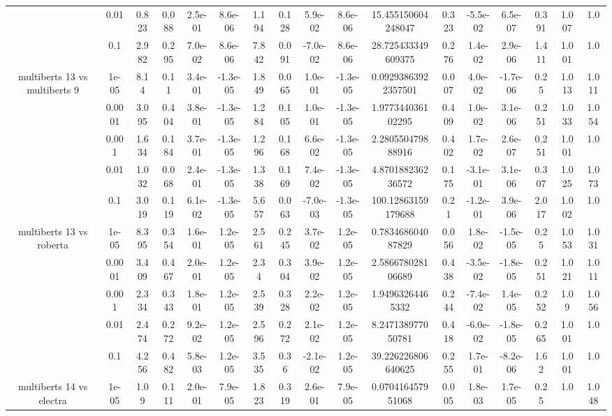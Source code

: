 \begin{tabular}{|c|c|c|c|c|c|c|c|c|c|c|c|c|c|c|c|c|}
 & 0.01 & 0.823 & 0.088 & 2.5e-01 & 8.6e-06 & 1.194 & 0.128 & 5.9e-02 & 8.6e-06 & 15.455150604248047 & 0.323 & -5.5e-02 & 6.5e-07 & 0.391 & 1.007 & 1.0 \\
 & 0.1 & 2.982 & 0.295 & 7.0e-02 & 8.6e-06 & 7.842 & 0.091 & -7.0e-02 & 8.6e-06 & 28.725433349609375 & 0.276 & 1.4e-02 & 2.9e-06 & 1.411 & 1.001 & 1.0 \\
\hline
\multirow{5}{*}{multiberts 13 vs multiberts 9} & 1e-05 & 8.14 & 0.11 & 3.4e-01 & -1.3e-05 & 1.849 & 0.065 & 1.0e-01 & -1.3e-05 & 0.09293863922357501 & 0.007 & 4.0e-02 & -1.7e-06 & 0.25 & 1.013 & 1.011 \\
 & 0.0001 & 3.095 & 0.404 & 3.8e-01 & -1.3e-05 & 1.284 & 0.105 & 1.0e-01 & -1.3e-05 & 1.977344036102295 & 0.409 & 1.0e-02 & 3.1e-06 & 0.251 & 1.033 & 1.054 \\
 & 0.001 & 1.634 & 0.184 & 3.7e-01 & -1.3e-05 & 1.296 & 0.168 & 6.6e-02 & -1.3e-05 & 2.280550479888916 & 0.402 & 1.7e-02 & 2.6e-07 & 0.251 & 1.001 & 1.0 \\
 & 0.01 & 1.032 & 0.068 & 2.4e-01 & -1.3e-05 & 1.338 & 0.169 & 7.4e-02 & -1.3e-05 & 4.870188236236572 & 0.175 & -3.1e-01 & 3.1e-06 & 0.307 & 1.025 & 1.073 \\
 & 0.1 & 3.019 & 0.119 & 6.1e-02 & -1.3e-05 & 5.657 & 0.063 & -7.0e-03 & -1.3e-05 & 100.12863159179688 & 0.21 & -1.2e-01 & 3.9e-06 & 2.017 & 1.002 & 1.0 \\
\hline
\multirow{5}{*}{multiberts 13 vs roberta } & 1e-05 & 8.395 & 0.354 & 1.6e-01 & 1.2e-05 & 2.561 & 0.245 & 3.7e-02 & 1.2e-05 & 0.783468604087829 & 0.056 & 1.8e-02 & -1.5e-05 & 0.25 & 1.053 & 1.031 \\
 & 0.0001 & 3.409 & 0.467 & 2.0e-01 & 1.2e-05 & 2.34 & 0.304 & 3.9e-02 & 1.2e-05 & 2.586678028106689 & 0.438 & -3.5e-02 & -1.8e-05 & 0.251 & 1.021 & 1.011 \\
 & 0.001 & 2.334 & 0.343 & 1.8e-01 & 1.2e-05 & 2.539 & 0.328 & 2.2e-02 & 1.2e-05 & 1.94963264465332 & 0.244 & -7.4e-02 & 1.4e-05 & 0.252 & 1.09 & 1.056 \\
 & 0.01 & 2.474 & 0.272 & 9.2e-02 & 1.2e-05 & 2.596 & 0.272 & 2.1e-02 & 1.2e-05 & 8.247138977050781 & 0.418 & -6.0e-02 & -1.8e-05 & 0.265 & 1.001 & 1.0 \\
 & 0.1 & 4.256 & 0.482 & 5.8e-03 & 1.2e-05 & 3.535 & 0.36 & -2.1e-02 & 1.2e-05 & 39.226226806640625 & 0.255 & 1.7e-01 & -8.2e-06 & 1.62 & 1.001 & 1.0 \\
\hline
\multirow{5}{*}{multiberts 14 vs electra } & 1e-05 & 1.09 & 0.111 & 2.0e-01 & 7.9e-05 & 1.823 & 0.319 & 2.6e-01 & 7.9e-05 & 0.070416457951068 & 0.005 & 1.8e-03 & 1.7e-05 & 0.25 & 1.0 & 1.048 \\

\end{tabular}
